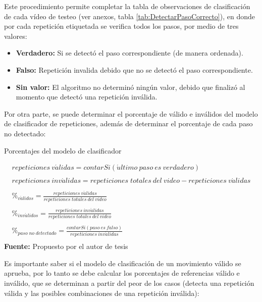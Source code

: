 Este procedimiento permite completar la tabla de observaciones de clasificaci\'on de cada v\'ideo de testeo (ver anexos, tabla \ref{tab:DetectarPasoCorrecto}), en donde por cada repetici\'on etiquetada se verifica todos los pasos, por medio de tres valores:
\begin{itemize}
\item \textbf{Verdadero:} Si se detect\'o el paso correspondiente (de manera ordenada).
\item \textbf{Falso:} Repetici\'on invalida debido que no se detect\'o el paso correspondiente. 
\item \textbf{Sin valor:} El algoritmo no determin\'o ning\'un valor, debido que finaliz\'o al momento  que detect\'o una repetici\'on inv\'alida.
\end{itemize}
Por otra parte, se puede determinar el porcentaje de v\'alido e inv\'alidos del modelo de clasificador de repeticiones, adem\'as de determinar el porcentaje de cada paso no detectado:
\begin{formula}[H]
	\centering
	\caption{Porcentajes del modelo de clasificador}
	\label{frm:porcentajeClasificador}
	\begin{equation}
\begin{matrix}
repeticiones\: v\acute{a}lidas = contarSi(\acute{u}ltimo\: paso\: es\: verdadero) \\ 
 \\ 
repeticiones\: inv\acute{a}lidas = repeticiones\; totales\: del\: video - repeticiones\: v\acute{a}lidas\\ 
 \\ 
\%_{v\acute{a}lidos}=\frac{repeticiones\: v\acute{a}lidas}{repeticiones\; totales\: del\: video}\\ 
\\
\%_{inv\acute{a}lidos}=\frac{repeticiones\: inv\acute{a}lidas}{repeticiones\; totales\: del\: video}\\ 
\\ 
\%_{paso\; no\; detectado}=\frac{contarSi(paso\: es\: falso)}{repeticiones\: inv\acute{a}lidas}\\ 
\end{matrix}
	\end{equation}
	\textbf{Fuente:} Propuesto por el autor de tesis
\end{formula}
Es importante saber si el modelo de clasificaci\'on  de un movimiento v\'alido se aprueba, por lo tanto se debe calcular los porcentajes de referencias v\'alido e inv\'alido, que se determinan a partir del peor de los casos (detecta una repetici\'on v\'alida y las posibles combinaciones de una  repetici\'on inv\'alida): 
